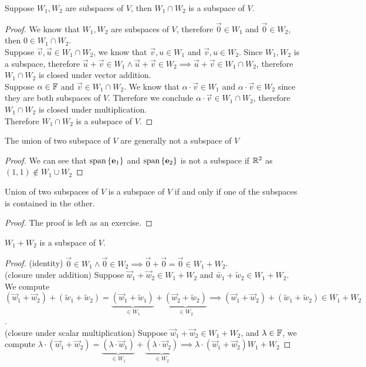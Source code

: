 \begin{theorem}
    Suppose $W_1,W_2$ are subspaces of $V$, then $W_1 \cap W_2$ is a subspace of $V$.
\end{theorem}
\begin{proof}
    We know that $W_1,W_2$ are subspaces of $V$, therefore $\vec 0 \in W_1$ and $\vec 0 \in W_2$, then $0 \in W_1 \cap W_2$. \\
    Suppose $\vec v,\vec u \in W_1 \cap W_2$, we know that $\vec v,u \in W_1$ and $\vec v,u \in W_2$. Since $W_1,W_2$ is a subspace, therefore $\vec u + \vec v \in W_1 \land \vec u + \vec v \in W_2 \implies \vec u + \vec v \in W_1 \cap W_2$, therefore $W_1 \cap W_2$ is closed under vector addition. \\ 
    Suppose $\alpha \in \mathbb F$ and $\vec v \in W_1 \cap W_2$. We know that $\alpha \cdot \vec v \in W_1$ and $\alpha \cdot \vec v \in W_2$ since they are both subspaces of $V$. Therefore we conclude $\alpha \cdot \vec v \in W_1 \cap W_2$, therefore $W_1 \cap W_2$ is closed under multiplication. \\
    Therefore $W_1 \cap W_2$ is a subspace of $V$.
\end{proof}
\begin{proposition}
    The union of two subspace of $V$ are generally not a subspace of $V$
\end{proposition}
\begin{proof}
    We can see that $\text{span} \left\{ \mathbf e_1 \right\}$ and $\text{span} \left\{ \mathbf e_2 \right\}$ is not a subspace if $\mathbb R^2$ as $(1,1) \not\in W_1 \cup W_2$ 
\end{proof}
\begin{theorem}
    Union of two subspaces of $V$ is a subspace of $V$ if and only if one of the subspaces is contained in the other.
\end{theorem}
\begin{proof}
    The proof is left as an exercise.
\end{proof}
\begin{theorem}
    $W_1 + W_2$ is a subspace of $V$.
\end{theorem}
\begin{proof}
    (identity) $\vec 0 \in W_1 \land \vec 0 \in W_2 \implies \vec 0 + \vec 0 = \vec 0 \in W_1 + W_2$. \\
    (closure under addition) Suppose $\vec w_1 + \vec w_2 \in W_1 + W_2$ and $\tilde {w_1} + \tilde  w_2 \in W_1 + W_2$. We compute $(\vec w_1 + \vec w_2) + (\tilde  w_1 + \tilde  w_2) = \underbrace{(\vec w_1 + \tilde  w_1)}_{\in W_1} + \underbrace{(\vec w_2 + \tilde  w_2)}_{\in W_2} \implies (\vec w_1 + \vec w_2) + (\tilde  w_1 + \tilde  w_2) \in W_1 + W_2$. \\
    (closure under scalar multiplication) Suppose $\vec w_1 + \vec w_2 \in W_1 + W_2$, and $\lambda \in \mathbb F$, we compute $\lambda \cdot (\vec w_1 + \vec w_2)  = \underbrace{(\lambda \cdot \vec w_1)}_{\in W_1} + \underbrace{(\lambda \cdot \vec w_2)}_{\in W_2} \implies \lambda \cdot (\vec w_1 + \vec w_2) W_1 + W_2$
\end{proof}
